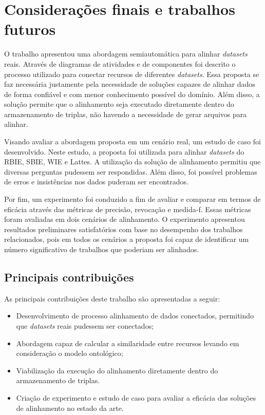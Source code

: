 \chapter{Considerações finais e trabalhos futuros}

O trabalho apresentou uma abordagem semiautomática para alinhar \textit{datasets} reais. Através de diagramas de atividades e de componentes foi descrito o processo utilizado para conectar recursos de diferentes \textit{datasets}. Essa proposta se faz necessária justamente pela necessidade de soluções capazes de alinhar dados de forma confiável e com menor conhecimento possível do domínio. Além disso, a solução permite que o alinhamento seja executado diretamente dentro do armazenamento de triplas, não havendo a necessidade de gerar arquivos para alinhar. 

Visando avaliar a abordagem proposta em um cenário real, um estudo de caso foi desenvolvido. Neste estudo, a proposta foi utilizada para alinhar \textit{datasets} do RBIE, SBIE, WIE e Lattes. A utilização da solução de alinhamento permitiu que diversas perguntas pudessem ser respondidas. Além disso, foi possível problemas de erros e insistências nos dados puderam ser encontrados.

Por fim, um experimento foi conduzido  a fim de avaliar e comparar em termos de eficácia através das métricas de precisão, revocação e medida-f. Essas métricas foram avaliadas em dois cenários de alinhamento. O experimento apresentou resultados preliminares satisfatórios com base no desempenho dos trabalhos relacionados, pois em todos os cenários a proposta foi capaz de identificar um número significativo de trabalhos que poderiam ser alinhados. 

\section{Principais contribuições}
As principais contribuições deste trabalho são apresentadas a seguir:
\begin{itemize}
\item Desenvolvimento de processo alinhamento de dados conectados, permitindo que \textit{datasets} reais pudessem ser conectados;
\item Abordagem capaz de calcular a similaridade entre recursos levando em consideração o modelo ontológico;
\item Viabilização da execução do alinhamento diretamente dentro do armazenamento de triplas.
\item  Criação de experimento e estudo de caso para avaliar a eficácia das soluções de alinhamento no estado da arte.
\end{itemize}

